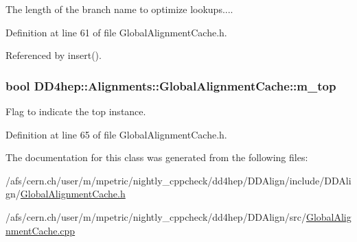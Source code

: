 The length of the branch name to optimize lookups.... 

Definition at line 61 of file GlobalAlignmentCache.h.

Referenced by insert().\hypertarget{class_d_d4hep_1_1_alignments_1_1_global_alignment_cache_ad8ec69133c554aee9f43b7952d29c65e}{
\subsubsection[{m\_\-top}]{\setlength{\rightskip}{0pt plus 5cm}bool {\bf DD4hep::Alignments::GlobalAlignmentCache::m\_\-top}}}
\label{class_d_d4hep_1_1_alignments_1_1_global_alignment_cache_ad8ec69133c554aee9f43b7952d29c65e}


Flag to indicate the top instance. 

Definition at line 65 of file GlobalAlignmentCache.h.

The documentation for this class was generated from the following files:\begin{DoxyCompactItemize}
\item 
/afs/cern.ch/user/m/mpetric/nightly\_\-cppcheck/dd4hep/DDAlign/include/DDAlign/\hyperlink{_global_alignment_cache_8h}{GlobalAlignmentCache.h}\item 
/afs/cern.ch/user/m/mpetric/nightly\_\-cppcheck/dd4hep/DDAlign/src/\hyperlink{_global_alignment_cache_8cpp}{GlobalAlignmentCache.cpp}\end{DoxyCompactItemize}
